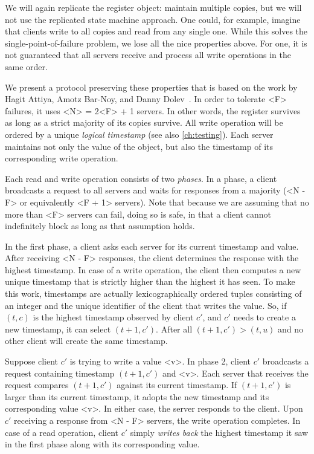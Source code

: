 \documentclass{report}
\begin{document}
We will again replicate the register object: maintain multiple copies,
but we will not use the replicated state machine approach.
One could, for example, imagine that clients write to all copies and read
from any single one.
While this solves the single-point-of-failure problem, we lose all the
nice properties above.  For one, it is not guaranteed that all servers
receive and process all write operations in the same order.

%
We present a protocol preserving these properties that is based on the
work by Hagit Attiya, Amotz Bar-Noy, and Danny Dolev~\cite{ABD95}.
In order to tolerate <{F}> failures,
it uses <{N}> = 2<{F}> + 1 servers.
In other words, the register survives as long as a strict majority of
its copies survive.
All write operation will be ordered by a unique \emph{logical timestamp}
(see also \autoref{ch:testing}).
Each server maintains not only the value of the object, but also the
timestamp of its corresponding write operation.

Each read and write operation consists of two \emph{phases}.  In a phase,
a client broadcasts a request to all servers and waits for responses
from a majority (<{N - F}> or equivalently
<{F + 1}> servers).  Note that because we are assuming that no
more than <{F}> servers can fail, doing so is safe, in that a client
cannot indefinitely block as long as that assumption holds.

In the first phase, a client asks each server for its current
timestamp and value.  After receiving <{N - F}> responses,
the client determines the response with the highest timestamp.
In case of a write operation, the client then computes a new unique
timestamp that is strictly higher than the highest it has seen.
To make this work, timestamps are actually lexicographically ordered
tuples consisting of an integer and the unique identifier of the
client that writes the value.  So, if $(t, c)$ is the highest timestamp
observed by client $c'$, and $c'$  needs to create a new timestamp,
it can select $(t + 1, c')$.
After all $(t + 1, c') > (t, u)$ and no other client
will create the same timestamp.

Suppose client $c'$ is trying to write a value <{v}>.
In phase 2, client $c'$ broadcasts a request containing timestamp $(t+1, c')$
and <{v}>.  Each server that receives the request compares $(t+1, c')$ against
its current timestamp.  If $(t+1, c')$ is larger than its current timestamp,
it adopts the new timestamp and its corresponding value <{v}>.  In either case,
the server responds to the client.
Upon $c'$ receiving a response from <{N - F}> servers,
the write operation completes.
In case of a read operation, client $c'$ simply \emph{writes back} the
highest timestamp it saw in the first phase along with its corresponding value.
\end{document}
